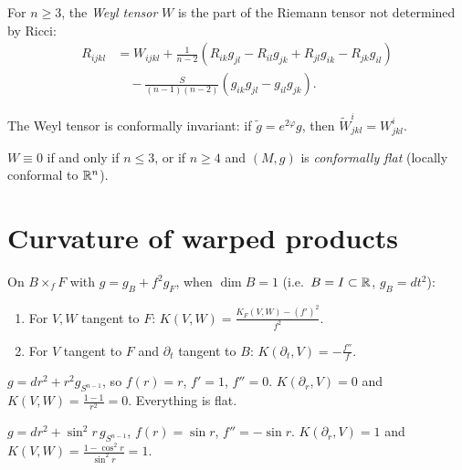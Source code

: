 \begin{definition}
For $n \geq 3$, the \emph{Weyl tensor} $W$ is the part of the Riemann tensor
not determined by Ricci:
\begin{align*}
    R_{ijkl} &= W_{ijkl} + \frac{1}{n-2}\left(R_{ik}g_{jl} - R_{il}g_{jk}
    + R_{jl}g_{ik} - R_{jk}g_{il}\right) \\
    &\quad - \frac{S}{(n-1)(n-2)}\left(g_{ik}g_{jl} - g_{il}g_{jk}\right).
\end{align*}
\end{definition}

\begin{proposition}
The Weyl tensor is conformally invariant: if $\tilde{g} = e^{2\varphi}g$, then
$\tilde{W}^i_{jkl} = W^i_{jkl}$.
\end{proposition}

\begin{proposition}
$W \equiv 0$ if and only if $n \leq 3$, or if $n \geq 4$ and $(M,g)$ is
\emph{conformally flat} (locally conformal to $\mathbb{R}^n$).
\end{proposition}

\section{Curvature of warped products}

\begin{proposition}
On $B \times_f F$ with $g = g_B + f^2 g_F$, when $\dim B = 1$ (i.e.\
$B = I \subset \mathbb{R}$, $g_B = dt^2$):
\begin{enumerate}
    \item For $V, W$ tangent to $F$:
    $K(V, W) = \frac{K_F(V,W) - (f')^2}{f^2}$.
    \item For $V$ tangent to $F$ and $\partial_t$ tangent to $B$:
    $K(\partial_t, V) = -\frac{f''}{f}$.
\end{enumerate}
\end{proposition}

\begin{example}
$g = dr^2 + r^2 g_{S^{n-1}}$, so $f(r) = r$, $f' = 1$, $f'' = 0$.
$K(\partial_r, V) = 0$ and $K(V, W) = \frac{1 - 1}{r^2} = 0$. Everything is flat.
\end{example}

\begin{example}
$g = dr^2 + \sin^2\!r\, g_{S^{n-1}}$, $f(r) = \sin r$, $f'' = -\sin r$.
$K(\partial_r, V) = 1$ and $K(V,W) = \frac{1 - \cos^2 r}{\sin^2 r} = 1$.
\end{example}

